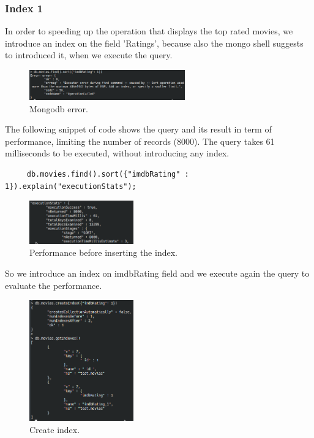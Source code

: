 \documentclass[a4paper, oneside]{article}
\begin{document}
\subsubsection{Index 1}
In order to speeding up the operation that displays the top rated movies, we introduce an index on the field 'Ratings', because also the mongo shell suggests to introduced it, when we execute the query.
\begin{figure}[H]
\centering
\includegraphics[width=0.6\textwidth]{./images/screens/errorSize} 
\caption{Mongodb error.}
\label{fig:admin1}
\end{figure}
The following snippet of code shows the query and its result in term of performance, limiting the number of records (8000). The query takes 61 milliseconds to be executed, without introducing any index.
\begin{verbatim}
     db.movies.find().sort({"imdbRating" : 1}).explain("executionStats");
\end{verbatim}
\begin{figure}[H]
\centering
\includegraphics[width=0.4\textwidth]{./images/screens/timeNoIndex} 
\caption{Performance before inserting the index.}
\label{fig:admin1}
\end{figure}
So we introduce an index on imdbRating field and we execute again the query to evaluate the performance.
\begin{figure}[H]
\centering
\includegraphics[width=0.4\textwidth]{./images/screens/createIndex} 
\caption{Create index.}
\label{fig:admin1}
\end{figure}
\end{document}
